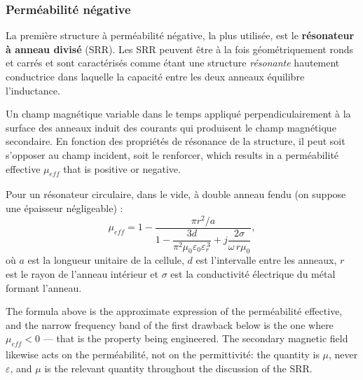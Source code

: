 \subsubsection{Perméabilité négative}

\begin{definition}
  La première structure à perméabilité négative, la plus utilisée, est le
  \textbf{résonateur à anneau divisé} (SRR). Les SRR peuvent être à la fois
  géométriquement ronds et carrés et sont caractérisés comme étant une
  structure \emph{résonante} hautement conductrice dans laquelle la capacité
  entre les deux anneaux équilibre l'inductance.
\end{definition}

Un champ magnétique variable dans le temps appliqué perpendiculairement à la
surface des anneaux induit des courants qui produisent le champ magnétique
secondaire. En fonction des propriétés de résonance de la structure, il peut
soit s'opposer au champ incident, soit le renforcer, which results in a
perméabilité effective $\mu_{\mathit{eff}}$ that is positive or negative.

\begin{prop}
  Pour un résonateur circulaire, dans le vide, à double anneau fendu (on
  suppose une épaisseur négligeable) :
  \[
    \mu_{\mathit{eff}} = 1 -
      \frac{\pi r^2 / a}
           {1 - \dfrac{3d}{\pi^2\mu_0\varepsilon_0\varepsilon_r^{\,3}}
              + j\dfrac{2\sigma}{\omega\, r\mu_0}} ,
  \]
  où $a$ est la longueur unitaire de la cellule, $d$ est l'intervalle entre les
  anneaux, $r$ est le rayon de l'anneau intérieur et $\sigma$ est la
  conductivité électrique du métal formant l'anneau.
\end{prop}

\begin{remark}
  The formula above is the approximate expression of the perméabilité
  effective, and the narrow frequency band of the first drawback below is the
  one where $\mu_{\mathit{eff}} < 0$ --- that is the property being engineered.
  The secondary magnetic field likewise acts on the perméabilité, not on the
  permittivité: the quantity is $\mu$, never $\varepsilon$, and $\mu$ is the
  relevant quantity throughout the discussion of the SRR.
\end{remark}

